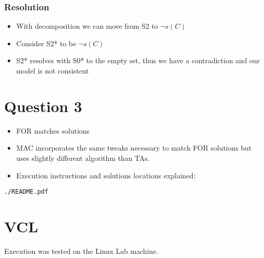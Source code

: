 \documentclass[11pt]{article}
\begin{document}
\subsubsection{Resolution}
\label{sec:org7b50cc4}
\begin{itemize}
\item With decomposition we can move from S2 to \(\lnot s(C)\)
\item Consider S2* to be \(\lnot s(C)\)
\item S2* resolves with S0* to the empty set, thus we have a contradiction and our model is not consistent
\end{itemize}
\section{Question 3}
\label{sec:org872b529}
\begin{itemize}
\item FOR matches solutions
\item MAC incorporates the same tweaks necessary to match FOR solutions but uses slightly different algorithm than TAs.
\item Execution instructions and solutions locations explained:
\end{itemize}
\lstset{language=shell,label= ,caption= ,captionpos=b,numbers=none}
\begin{lstlisting}
./README.pdf
\end{lstlisting}
\section{VCL}
\label{sec:orgcd80901}
Execution was tested on the Linux Lab machine.
\end{document}
